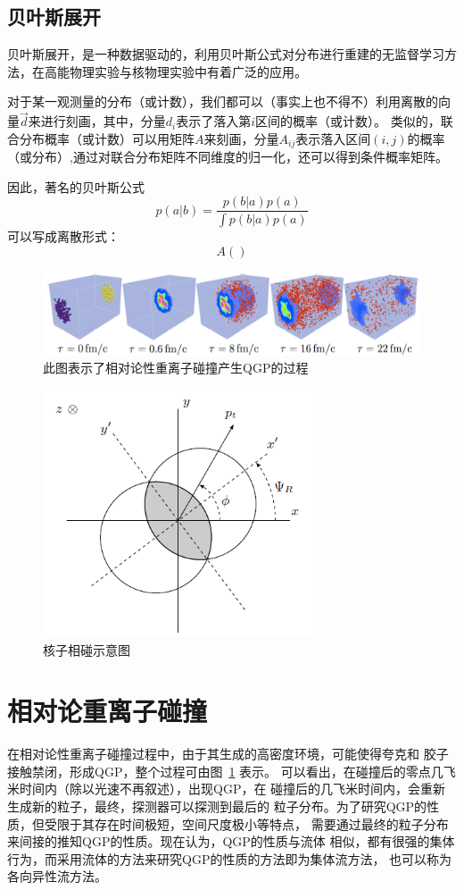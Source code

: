 \documentclass[aps,pre,12pt,preprint,onecolumn,showpacs,showkeys]{revtex4-1}
\begin{document}
\subsection{贝叶斯展开}
贝叶斯展开，是一种数据驱动的，利用贝叶斯公式对分布进行重建的无监督学习方法，在高能物理实验与核物理实验中有着广泛的应用。\par
对于某一观测量的分布（或计数），我们都可以（事实上也不得不）利用离散的向量$\vec{d}$来进行刻画，其中，分量$d_i$表示了落入第$i$区间的概率（或计数）。
类似的，联合分布概率（或计数）可以用矩阵$A$来刻画，分量$A_{ij}$表示落入区间$(i,j)$的概率（或分布）,通过对联合分布矩阵不同维度的归一化，还可以得到条件概率矩阵。\par
因此，著名的贝叶斯公式
$$p(a|b)=\frac{p(b|a)p(a)}{\int p(b|a)p(a)}$$
可以写成离散形式：
$$A()$$
\begin{figure}[t]
\centering
\includegraphics[width=140mm]{QGP}
\caption{\label{fig:QGP}%
此图表示了相对论性重离子碰撞产生QGP的过程}
\end{figure}
\begin{figure}[t]
\centering
\includegraphics[width=80mm]{hz}
\caption{\label{fig:hz}%
核子相碰示意图}
\end{figure}
\section{相对论重离子碰撞}
在相对论性重离子碰撞过程中，由于其生成的高密度环境，可能使得夸克和
胶子接触禁闭，形成QGP，整个过程可由图~\ref{fig:QGP} 表示\cite{2013PhDT........31Q}。
可以看出，在碰撞后的零点几飞米时间内（除以光速不再叙述），出现QGP，在
碰撞后的几飞米时间内，会重新生成新的粒子，最终，探测器可以探测到最后的
粒子分布。为了研究QGP的性质，但受限于其存在时间极短，空间尺度极小等特点，
需要通过最终的粒子分布来间接的推知QGP的性质。现在认为，QGP的性质与流体
相似，都有很强的集体行为，而采用流体的方法来研究QGP的性质的方法即为集体流方法，
也可以称为各向异性流方法\cite{2010LanB...23..240H}。
\end{document}
